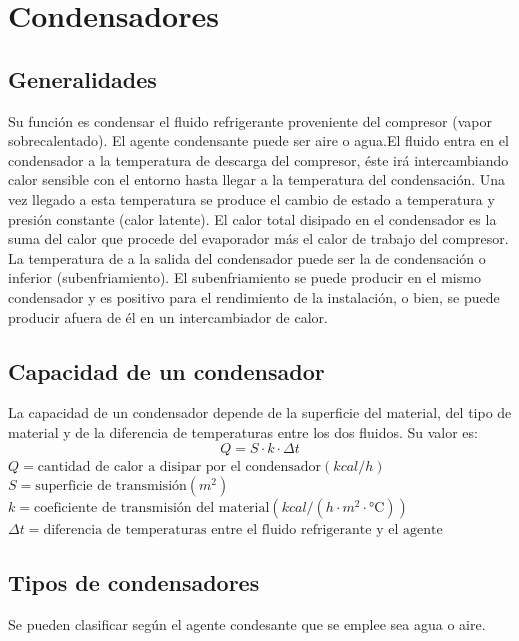 \chapter{Condensadores}
\section{Generalidades}

Su funci\'on es condensar el fluido refrigerante proveniente del compresor (vapor sobrecalentado). El agente condensante puede ser aire o agua.El fluido entra en el condensador a la temperatura de descarga del compresor, \'este ir\'a intercambiando calor sensible con el entorno hasta llegar a la temperatura del condensaci\'on. Una vez llegado a esta temperatura se produce el cambio de estado a temperatura y presi\'on constante (calor latente). El calor total disipado en el condensador es la suma del calor que procede del evaporador m\'as el calor de trabajo del compresor. La temperatura de a la salida del condensador puede ser la de condensaci\'on o inferior (subenfriamiento). El subenfriamiento se puede producir en el mismo condensador y es positivo para el rendimiento de la instalaci\'on, o bien, se puede producir afuera de \'el en un intercambiador de calor.

\section{Capacidad de un condensador}

La capacidad de un condensador depende de la superficie del material, del tipo de material y de la diferencia de temperaturas entre los dos fluidos. Su valor es:
\begin{equation*}
    Q = S \cdot k \cdot \varDelta t
\end{equation*}
$Q = \text{cantidad de calor a disipar por el condensador}(kcal/h)$\\
$S = \text{superficie de transmisi\'on}(m^2)$\\
$k = \text{coeficiente de transmisi\'on del material}(kcal/(h \cdot m^2 \cdot \text{°C}))$\\
$\varDelta t = \text{diferencia de temperaturas entre el fluido refrigerante y el agente condensante(°C)}$

\section{Tipos de condensadores}

Se pueden clasificar seg\'un el agente condesante que se emplee sea agua o aire.

